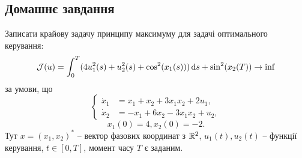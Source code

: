 \subsection{Домашнє завдання}

\begin{problem}
    Записати крайову задачу принципу максимуму для задачі оптимального керування:
    \begin{equation*}
        \mathcal{J}(u) = \int_0^T (4 u_1^2(s) + u_2^2(s) + \cos^2(x_1(s))) \mathop{}\!\mathrm{d} s + \sin^2(x_2(T)) \to \inf
    \end{equation*}
    за умови, що
    \[ \left\{ \begin{aligned}
        \dot x_1 &= x_1 + x_2 + 3 x_1 x_2 + 2 u_1, \\
        \dot x_2 &= - x_1 + 6 x_2 - 3 x_1 x_2 + u_2,
    \end{aligned} \right. \]
    \begin{equation*}
        x_1(0) = 4, x_2(0) = -2.
    \end{equation*}
    Тут $x = (x_1, x_2)^*$ -- вектор фазових координат з $\mathbb{R}^2$, $u_1(t), u_2(t)$ -- функції керування, $t \in [0, T]$, момент часу $T$ є заданим.
\end{problem}

